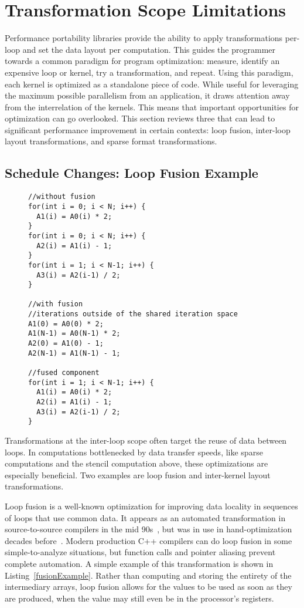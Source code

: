 \section{Transformation Scope Limitations}

Performance portability libraries provide the ability to apply transformations per-loop and set the data layout per computation.
This guides the programmer towards a common paradigm for program optimization: measure, identify an expensive loop or kernel, try a transformation, and repeat.
Using this paradigm, each kernel is optimized as a standalone piece of code.
While useful for leveraging the maximum possible parallelism from an application, it draws attention away from the interrelation of the kernels.
This means that important opportunities for optimization can go overlooked.
This section reviews three that can lead to significant performance improvement in certain contexts: loop fusion, inter-loop layout transformations, and sparse format transformations.

\subsection{Schedule Changes: Loop Fusion Example}
\begin{figure}
\begin{lstlisting}[caption={Three loops, with and without loop fusion.},label=fusionExample]
//without fusion
for(int i = 0; i < N; i++) {
  A1(i) = A0(i) * 2;
}
for(int i = 0; i < N; i++) {
  A2(i) = A1(i) - 1;
}
for(int i = 1; i < N-1; i++) {
  A3(i) = A2(i-1) / 2;
}

//with fusion
//iterations outside of the shared iteration space
A1(0) = A0(0) * 2;
A1(N-1) = A0(N-1) * 2;
A2(0) = A1(0) - 1;
A2(N-1) = A1(N-1) - 1;

//fused component
for(int i = 1; i < N-1; i++) {
  A1(i) = A0(i) * 2;
  A2(i) = A1(i) - 1;
  A3(i) = A2(i-1) / 2;
}
\end{lstlisting}
\end{figure}

Transformations at the inter-loop scope often target the reuse of data between loops.
In computations bottlenecked by data transfer speeds, like sparse computations and the stencil computation above, these optimizations are especially beneficial. 
Two examples are loop fusion and inter-kernel layout transformations.

Loop fusion is a well-known optimization for improving data locality in sequences of loops that use common data.
It appears as an automated transformation in source-to-source compilers in the mid 90s~\cite{mckinley1996improving}, but was in use in hand-optimization decades before~\cite{warren1984hierarchical,cocke1971catalogue}.
Modern production C++ compilers can do loop fusion in some simple-to-analyze situations, but function calls and pointer aliasing prevent complete automation.
A simple example of this transformation is shown in Listing~\ref{fusionExample}.
Rather than computing and storing the entirety of the intermediary arrays, loop fusion allows for the values to be used as soon as they are produced, when the value may still even be in the processor's registers.

